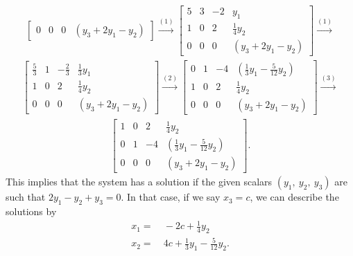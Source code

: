 \documentclass[12pt]{article}
\begin{document}
\begin{comm}
\begin{align*}
\begin{bmatrix}
      0 & 0 & 0  & (y_3 + 2y_1 - y_2)
    \end{bmatrix}
    \xrightarrow{(1)}
    \begin{bmatrix}
      5 & 3 & -2 & y_1\\
      1 & 0 & 2  & \frac{1}{4}y_2\\
      0 & 0 & 0  & (y_3 + 2y_1 - y_2)
    \end{bmatrix}
    \xrightarrow{(1)}
  \end{align*}
  \begin{align*}
    \begin{bmatrix}
      \frac{5}{3} & 1 & -\frac{2}{3} & \frac{1}{3}y_1\\
      1 & 0 & 2  & \frac{1}{4}y_2\\
      0 & 0 & 0  & (y_3 + 2y_1 - y_2)
    \end{bmatrix}
    \xrightarrow{(2)}
    \begin{bmatrix}
      0 & 1 & -4 & (\frac{1}{3}y_1 - \frac{5}{12}y_2)\\
      1 & 0 & 2  & \frac{1}{4}y_2\\
      0 & 0 & 0  & (y_3 + 2y_1 - y_2)
    \end{bmatrix}
    \xrightarrow{(3)}
  \end{align*}
  \begin{align*}
    \begin{bmatrix}
      1 & 0 & 2  & \frac{1}{4}y_2\\
      0 & 1 & -4 & (\frac{1}{3}y_1 - \frac{5}{12}y_2)\\
      0 & 0 & 0  & (y_3 + 2y_1 - y_2)
    \end{bmatrix}.
  \end{align*}
  This implies that the system has a solution if the given
  scalars $(y_1,\ y_2,\ y_3)$ are such that $2y_1 - y_2 + y_3 =
  0$. In that case, if we say $x_3 = c$, we can describe the
  solutions by
  \begin{align*}
    x_1 =&\ -2c + \frac{1}{4}y_2\\
    x_2 =&\ 4c + \frac{1}{3}y_1 - \frac{5}{12}y_2.
  \end{align*}
\end{comm}
\end{document}
